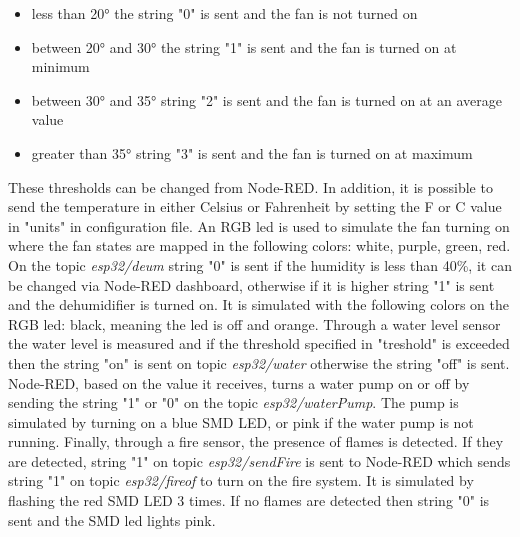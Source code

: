 \documentclass[]{scrartcl}
\begin{document}
\begin{itemize}
	\item less than 20° the string "0" is sent and the fan is not turned on
	\item between 20° and 30° the string "1" is sent and the fan is turned on at minimum 
	\item between 30° and 35° string "2" is sent and the fan is turned on at an average value
	\item greater than 35° string "3" is sent and the fan is turned on at maximum
\end{itemize}
These thresholds can be changed from Node-RED. In addition, it is possible to send the temperature in either Celsius or Fahrenheit by setting the F or C value in "units" in configuration file.
\newline
An RGB led is used to simulate the fan turning on where the fan states are mapped in the following colors: white, purple, green, red.
\newline\newline
On the topic \textit{esp32/deum} string "0" is sent if the humidity is less than 40\%, it can be changed via Node-RED dashboard, otherwise if it is higher string "1" is sent and the dehumidifier is turned on. It is simulated with the following colors on the RGB led: black, meaning the led is off and orange.
\newline \newline
Through a water level sensor the water level is measured and if the threshold specified in "treshold" is exceeded then the string "on" is sent on topic \textit{esp32/water} otherwise the string "off" is sent. Node-RED, based on the value it receives, turns a water pump on or off by sending the string "1" or "0" on the topic \textit{esp32/waterPump}. The pump is simulated by turning on a blue SMD LED, or pink if the water pump is not running.
\newline \newline
Finally, through a fire sensor, the presence of flames is detected. If they are detected, string "1" on topic \textit{esp32/sendFire} is sent to Node-RED which sends string "1" on topic \textit{esp32/fireof} to turn on the fire system. It is simulated by flashing the red SMD LED 3 times. If no flames are detected then string "0" is sent and the SMD led lights pink.
\end{document}
